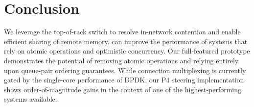 \section{Conclusion}

We leverage the top-of-rack switch to resolve in-network
contention and enable efficient sharing of remote memory.
{\sword} can improve the performance of systems that rely on
atomic operations and optimistic concurrency. Our
full-featured prototype demonstrates the potential of
removing atomic operations and relying entirely upon
queue-pair ordering guarantees.  While connection
multiplexing is currently gated by the single-core
performance of DPDK, our P4 steering implementation shows
order-of-magnitude gains in the context of one of the
highest-performing systems available.

